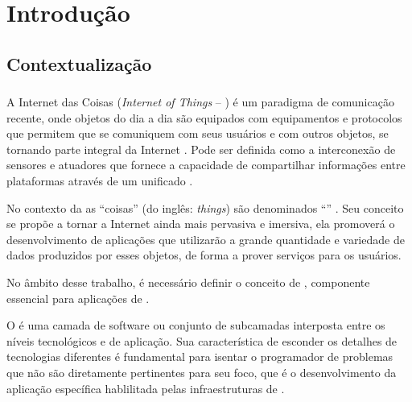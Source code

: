 \chapter{Introdução}

\section{Contextualização}

\subsection{\iot}

A Internet das Coisas (\textit{Internet of Things} -- \iot) é um paradigma de comunicação recente, onde objetos do dia a dia são equipados com equipamentos e protocolos que permitem que se comuniquem com seus usuários e com outros objetos, se tornando parte integral da Internet \cite{Atzori:2010}.  Pode ser definida como a interconexão de sensores e atuadores que fornece a capacidade de compartilhar informações entre plataformas através de um \framework{} unificado \cite{gubbi2013internet}. 

No contexto da \iot{} as ``coisas'' (do inglês: \textit{things}) são denominados ``\smartobjs'' \cite{bandyopadhyay2011internet}. Seu conceito se propõe a tornar a Internet ainda mais pervasiva e imersiva, ela promoverá o desenvolvimento de aplicações que utilizarão a grande quantidade e variedade de dados produzidos por esses objetos, de forma a prover serviços para os usuários. 


No âmbito desse trabalho, é necessário definir o conceito de \middleware{}, componente essencial para aplicações de \iot{}.
\begin{citacao}
	O \middleware{} é uma camada de software ou conjunto de subcamadas interposta entre os níveis tecnológicos e de aplicação. Sua característica de esconder os detalhes de tecnologias diferentes é fundamental para isentar o programador de problemas que não são diretamente pertinentes para seu foco, que é o desenvolvimento da aplicação específica hablilitada pelas infraestruturas de \iot{}. \cite[tradução~nossa]{Atzori:2010}
\end{citacao}

